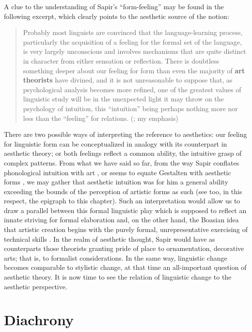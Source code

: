 \documentclass[output=paper]{langscibook}
\begin{document}
A clue to the understanding of Sapir's ``form-feeling'' may be found in the following excerpt, which clearly points to the aesthetic source of the notion:

\begin{quotation}
Probably most linguists are convinced that the language-learning process, particularly the acquisition of a feeling for the formal set of the language, is very largely unconscious and involves mechanisms that are quite distinct in character from either sensation or reflection. There is doubtless something deeper about our feeling for form than even the majority of \textbf{art theorists} have divined, and it is not unreasonable to suppose that, as psychological analysis becomes more refined, one of the greatest values of linguistic study will be in the unexpected light it may throw on the psychology of intuition, this ``intuition'' being perhaps nothing more nor less than the ``feeling'' for relations. (\citealt[156]{Sapir1924}; my emphasis)
\end{quotation}

There are two possible ways of interpreting the reference to aesthetics: our feeling for linguistic form can be conceptualized in analogy with its counterpart in aesthetic theory; or both feelings reflect a common ability, the intuitive grasp of complex patterns. From what we have said so far, from the way Sapir conflates phonological intuition with art \citep[34]{Sapir1925}, or seems to equate Gestalten with aesthetic forms \citep[145--150]{Sapir2002}, we may gather that aesthetic intuition was for him a general ability exceeding the bounds of the perception of artistic forms as such (see too, in this respect, the epigraph to this chapter). Such an interpretation would allow us to draw a parallel between this formal linguistic play which is supposed to reflect an innate striving for formal elaboration and, on the other hand, the Boasian idea that artistic creation begins with the purely formal, unrepresentative exercising of technical skills \citep{Boas1927}. In the realm of aesthetic thought, Sapir would have as counterparts those theorists granting pride of place to ornamentation, decorative arts; that is, to formalist considerations. In the same way, linguistic change becomes comparable to stylistic change, at that time an all-important question of aesthetic theory. It is now time to see the relation of linguistic change to the aesthetic perspective.

\section{Diachrony}
\label{sec:fortis:diachrony}
\end{document}
